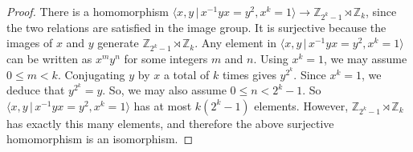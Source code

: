 \documentclass[10pt,a4paper]{amsart}
\begin{document}
\begin{proof}
There is a homomorphism $\langle x, y \, | \, x^{-1} y x = y^2, x^k = 1 \rangle \rightarrow \mathbb{Z}_{2^k-1} \rtimes \mathbb{Z}_k$, since the two relations are satisfied in the image group. It is surjective because the images of $x$ and $y$ generate $\mathbb{Z}_{2^k-1} \rtimes \mathbb{Z}_k$. Any element in $\langle x, y \, | \, x^{-1} y x = y^2, x^k = 1 \rangle$ can be written as $x^m y^n$ for some integers $m$ and $n$. Using $x^k = 1$, we may assume $0 \leq m < k$. Conjugating $y$ by $x$ a total of $k$ times gives $y^{2^k}$. Since $x^k = 1$, we deduce that $y^{2^k} = y$. So, we may also assume $0 \leq n < 2^{k}-1$. So $\langle x, y \, | \, x^{-1} y x = y^2, x^k = 1 \rangle$ has at most $k(2^k -1)$ elements. However, $\mathbb{Z}_{2^k-1} \rtimes \mathbb{Z}_k$ has exactly this many elements, and therefore the above surjective homomorphism is an isomorphism.
\end{proof}
\end{document}

